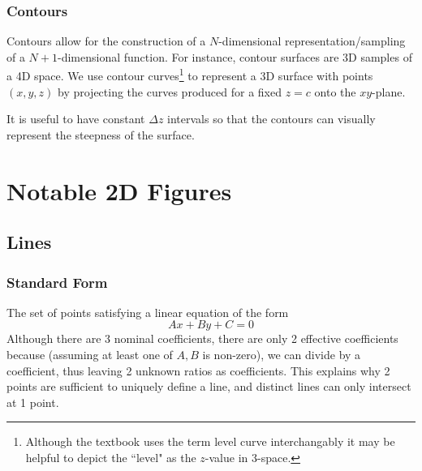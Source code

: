 \documentclass{article}
\begin{document}
\subsubsection{Contours}
Contours allow for the construction of a $N$-dimensional representation/sampling of a $N+1$-dimensional function. For instance, contour surfaces are 3D samples of a 4D space.
We use contour curves\footnote{Although the textbook uses the term level curve interchangably it may be helpful to depict the ``level" as the $z$-value in 3-space.} to represent a 3D surface with points $(x,y,z)$ by projecting the curves produced for a fixed $z=c$ onto the $xy$-plane.
\iffalse
Below is a (low resolution) contour plot of the top half of a sphere:
\begin{center}
\begin{tikzpicture}
\begin{axis}
[
    title={Contour plot of $x^2 + y^2 + z^2 = 1$},
    view={0}{90}
]
\addplot3[
    contour gnuplot={levels={1, 0.8, 0.6, 0.4, 0.2, 0}}
]
{sqrt(x^2+y^2)};
\end{axis}
\end{tikzpicture}
\end{center}
\fi
It is useful to have constant $\Delta z$ intervals so that the contours can visually represent the steepness of the surface.

\section{Notable 2D Figures}

\subsection{Lines}

\subsubsection{Standard Form} The set of points satisfying a linear equation of the form $$Ax + By + C = 0$$
Although there are 3 nominal coefficients, there are only 2 effective coefficients because (assuming at least one of $A,B$ is non-zero), we can divide by a coefficient, thus leaving 2 unknown ratios as coefficients. This explains why 2 points are sufficient to uniquely define a line, and distinct lines can only intersect at 1 point.
\end{document}
